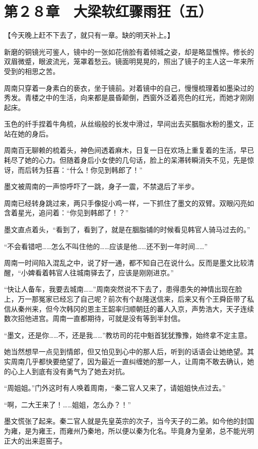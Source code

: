 \section{第２８章　大梁软红骤雨狂（五）}

【今天晚上赶不下去了，就只有一章。缺的明天补上。】

新磨的铜镜光可鉴人，镜中的一张如花俏脸有着倾城之姿，却是略显憔悴。修长的双眉微蹙，眼波流光，笼罩着愁云。镜面明晃晃的，照出了镜子的主人这一年来所受到的相思之苦。

周南只穿着一身素白的亵衣，坐于镜前。对着镜中的自己，慢慢梳理着如墨染过的秀发。青楼之中的生活，向来都是晨昏颠倒，西窗外泛着亮色的红光，而她才刚刚起床。

玉色的纤手捏着牛角梳，从丝缎般的长发中滑过，早间出去买胭脂水粉的墨文，正站在她的身后。

周南百无聊赖的梳着头，神色间透着麻木，日复一日在欢场上重复着的生活，早已耗尽了她的心力。但随着身后小女使的几句话，脸上的呆滞转瞬消失不见，先是惊讶，而后转为狂喜：“什么！你见到韩郎了！”

墨文被周南的一声惊呼吓了一跳，身子一震，不禁退后了半步。

周南已经转身跳过来，两只手像捉小鸡一样，一下抓住了墨文的双臂。双眼闪亮如含着星光，追问着：“你见到韩郎了！？”

墨文直点着头，“看到了，看到了，就是在胭脂铺的时候看见韩官人骑马过去的。”

“不会看错吧……怎么不叫住他的……应该是他……还不到一年时间……”

周南一时间陷入混乱之中，说了好一通，都不知自己在说什么。反而是墨文比较清醒，“小婢看着韩官人往城南驿去了，应该是刚刚进京。”

“快让人备车，我要去城南……”周南突然说不下去了，患得患失的神情出现在脸上，万一那冤家已经忘了自己呢？前次有个赵隆送信来，后来又有个王舜臣带了私信从秦州来，但今次韩冈的恩主王韶率归顺朝廷的蕃人入京，声势浩大，天子连续数次招他进宫。周南一直都期待，可就是没有等到半封信。

“墨文，还是你……不，还是我……”教坊司的花中魁首犹犹豫豫，始终拿不定主意。

她当然想早一点见到情郎，但又怕见到心中的那人后，听到的话语会让她绝望。其实周南几乎都快要绝望了，因为最近一直纠缠她的那一人，让周南不敢去确认，她的心上人到底有没有勇气为了她去对抗。

“周姐姐。”门外这时有人唤着周南，“秦二官人又来了，请姐姐快点过去。”

“啊，二大王来了！……姐姐，怎么办？！”

墨文慌张了起来。秦二官人就是先皇英宗的次子，当今天子的二弟。如今他的封国为雍，是为雍王，而雍州乃秦地，所以便以秦为化名。毕竟身为皇弟，总不能光明正大的出来逛窑子。

